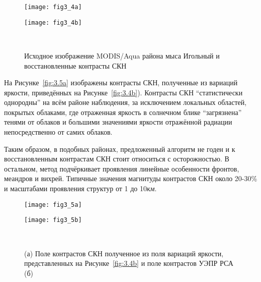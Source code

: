 \begin{figure}[H]
   	\centering
	\begin{minipage}{.47\textwidth}
	    \subcaptionbox{\label{fig:3.4a}}
		{\texttt{[image: fig3\_4a]}}
	\end{minipage}
	\hfill
	\begin{minipage}{.47\textwidth}
	    \subcaptionbox{\label{fig:3.4b}}
		{\texttt{[image: fig3\_4b]}}
	\end{minipage}
    \\
    \caption{Исходное изображение MODIS/Aqua района мыса Игольный и восстановленные контрасты СКН}
    \label{fig:3.4}
\end{figure}


На Рисунке~\ref{fig:3.5a} изображены контрасты СКН, полученные из вариаций яркости, приведённых на Рисунке~\ref{fig:3.4b}). Контрасты СКН ``статистически однородны'' на всём районе наблюдения, за исключением локальных областей, покрытых облаками, где отраженная яркость в солнечном блике ``загрязнена'' тенями от облаков и большими значениями яркости отражённой радиации непосредственно от самих облаков. 

Таким образом, в подобных районах, предложенный алгоритм не годен и к восстановленным контрастам СКН стоит относиться с осторожностью. В остальном, метод подчёркивает проявления линейные особенности фронтов, меандров и вихрей. Типичные значения магнитуды контрастов СКН около 20-30\% и масштабами проявления структур от 1 до 10\textit{км}.



\begin{figure}[H]
   	\centering
	\begin{minipage}{.47\textwidth}
	    \subcaptionbox{\label{fig:3.5a}}
		{\texttt{[image: fig3\_5a]}}
	\end{minipage}
	\hfill
	\begin{minipage}{.47\textwidth}
	    \subcaptionbox{\label{fig:3.5b}}
		{\texttt{[image: fig3\_5b]}}
	\end{minipage}
    \\
    \caption{(а) Поле контрастов СКН полученное из поля вариаций яркости, представленных на Рисунке~\ref{fig:3.4b} и поле контрастов УЭПР РСА (б)}
    \label{fig:3.5}
\end{figure}


